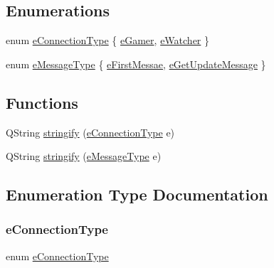 \subsection*{Enumerations}
\begin{DoxyCompactItemize}
\item 
enum \hyperlink{a00008_ab66d8802c50493de7d50e181d6f8e296}{e\+Connection\+Type} \{ \hyperlink{a00008_ab66d8802c50493de7d50e181d6f8e296ab02a4c796f7681c9c90e0c0865392828}{e\+Gamer}, 
\hyperlink{a00008_ab66d8802c50493de7d50e181d6f8e296af8a067d45287f02c8cd709a3495eb581}{e\+Watcher}
 \}
\item 
enum \hyperlink{a00008_a700ed30d49bfe436323e17539d3a0010}{e\+Message\+Type} \{ \hyperlink{a00008_a700ed30d49bfe436323e17539d3a0010aeab6dec369184e6c7d133812064686f9}{e\+First\+Messae}, 
\hyperlink{a00008_a700ed30d49bfe436323e17539d3a0010a0bc33fe8075a87a68af6a432b13d7b66}{e\+Get\+Update\+Message}
 \}
\end{DoxyCompactItemize}
\subsection*{Functions}
\begin{DoxyCompactItemize}
\item 
Q\+String \hyperlink{a00008_aabd3ff178ce3faed55804cc56f78fc6a}{stringify} (\hyperlink{a00008_ab66d8802c50493de7d50e181d6f8e296}{e\+Connection\+Type} e)
\item 
Q\+String \hyperlink{a00008_abb3e44449c2fd1fa9275c1d4273c66f9}{stringify} (\hyperlink{a00008_a700ed30d49bfe436323e17539d3a0010}{e\+Message\+Type} e)
\end{DoxyCompactItemize}


\subsection{Enumeration Type Documentation}
\mbox{\label{a00008_ab66d8802c50493de7d50e181d6f8e296}} 
\subsubsection{\texorpdfstring{e\+Connection\+Type}{eConnectionType}}
{\footnotesize\ttfamily enum \hyperlink{a00008_ab66d8802c50493de7d50e181d6f8e296}{e\+Connection\+Type}}

